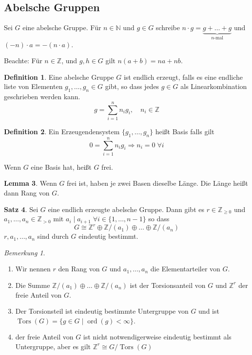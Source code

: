 \documentclass[12pt,parskip=full]{scrartcl}
\newcommand{\setN}{\mathbb{N}}
\newcommand{\setZ}{\mathbb{Z}}
\theoremstyle{definition}
\newtheorem{theorem}{Satz}[section]
\newtheorem{lemma}[theorem]{Lemma}
\newtheorem{definition}[theorem]{Definition}
\theoremstyle{remark}
\newtheorem*{remark}{Bemerkung}
\begin{document}
	\subsection{Abelsche Gruppen}
	
	Sei $G$ eine abelsche Gruppe. Für $n \in \setN$ und $g \in G$ schreibe $n \cdot g = \underbrace{g + \dots + g}_{\text{$n$-mal}}$ und $(-n) \cdot a = -(n \cdot a)$.
	
	Beachte: Für $n \in \setZ$, und $g,h \in G$ gilt $n(a + b) = n a + n b$.
	
	\begin{definition}
		Eine abelsche Gruppe $G$ ist endlich erzeugt, falls es eine endliche liste von Elementen $g_1, \dots, g_n \in G$ gibt, so dass jedes $g \in G$ als Linearkombination geschrieben werden kann.
		\begin{equation*}
			g = \sum_{i = 1}^n n_i g_i, \quad n_i \in \setZ
		\end{equation*}
	\end{definition}

	\begin{definition}
		Ein Erzeugendensystem $\{ g_1, \dots, g_n \}$ heißt Basis falls gilt
		\begin{equation*}
			0 = \sum_{i = 1}^n n_i g_i \Rightarrow n_i = 0 \; \forall i
		\end{equation*}
		
		Wenn $G$ eine Basis hat, heißt $G$ frei.
	\end{definition}

	\begin{lemma}
		Wenn $G$ frei ist, haben je zwei Basen dieselbe Länge. Die Länge heißt dann Rang von $G$.
	\end{lemma}

	\begin{theorem}
		Sei $G$ eine endlich erzeugte abelsche Gruppe. Dann gibt es $r \in \setZ_{\geq 0}$ und $a_1, \dots, a_n \in \setZ_{>0}$ mit $a_i \mid a_{i+1} \; \forall i \in \{ 1, \dots, n-1 \}$ so dass
		\begin{equation*}
			G \cong \setZ^r \oplus \setZ/(a_1) \oplus \dots \oplus \setZ/(a_n)
		\end{equation*}
		$r, a_1, \dots, a_n$ sind durch $G$ eindeutig bestimmt.
	\end{theorem}

	\begin{remark}
		\begin{enumerate}
			\item Wir nennen $r$ den Rang von $G$ und $a_1, \dots, a_n$ die Elementarteiler von $G$.
			\item Die Summe $\setZ/(a_1) \oplus \dots \oplus \setZ/(a_n)$ ist der Torsionsanteil von $G$ und $\setZ^r$ der freie Anteil von $G$.
			\item Der Torsionsteil ist eindeutig bestimmte Untergruppe von $G$ und ist $\operatorname{Tors}(G) = \{ g \in G \mid \operatorname{ord}(g) < \infty \}$.
			\item der freie Anteil von $G$ ist nicht notwendigerweise eindeutig bestimmt als Untergruppe, aber es gilt $\setZ^r \cong G/\operatorname{Tors}(G)$
		\end{enumerate}
	\end{remark}
\end{document}
